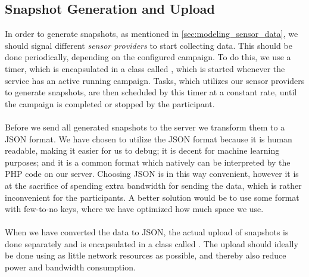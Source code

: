 \subsection{Snapshot Generation and Upload}
\label{sub:background_sensor_service_snapshot_generation_and_upload}
In order to generate snapshots, as mentioned in \ref{sec:modeling_sensor_data}, we should signal different \emph{sensor providers} to start collecting data. This should be done periodically, depending on the configured campaign. To do this, we use a timer, which is encapsulated in a class called , which is started whenever the service has an active running campaign. Tasks, which utilizes our sensor providers to generate snapshots, are then scheduled by this timer at a constant rate, until the campaign is completed or stopped by the participant.
\\\\
Before we send all generated snapshots to the server we transform them to a JSON format. We have chosen to utilize the JSON format because it is human readable, making it easier for us to debug; it is decent for machine learning purposes; and it is a common format which natively can be interpreted by the PHP code on our server. Choosing JSON is in this way convenient, however it is at the sacrifice of spending extra bandwidth for sending the data, which is rather inconvenient for the participants. A better solution would be to use some format with few-to-no keys, where we have optimized how much space we use. 
\\\\
When we have converted the data to JSON, the actual upload of snapshots is done separately and is encapsulated in a class called . The upload should ideally be done using as little network resources as possible, and thereby also reduce power and bandwidth consumption. 
\\\\
